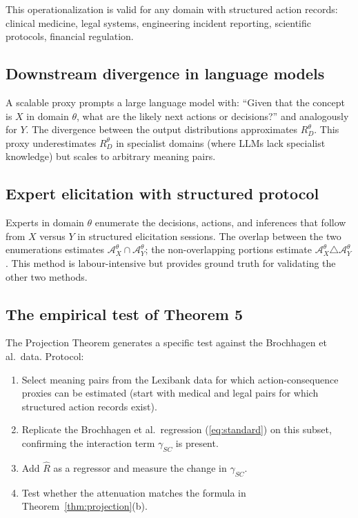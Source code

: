 \documentclass[12pt]{article}
\theoremstyle{rthm}
\theoremstyle{rdef}
\theoremstyle{remark}
\newcommand{\A}{\mathcal{A}}
\newcommand{\RD}[1][\theta]{R_{D}^{#1}}
\begin{document}
This operationalization is valid for any domain with structured action records:
clinical medicine, legal systems, engineering incident reporting, scientific
protocols, financial regulation.

\subsection{Downstream divergence in language models}

A scalable proxy prompts a large language model with: ``Given that the concept
is $X$ in domain $\theta$, what are the likely next actions or decisions?''
and analogously for $Y$. The divergence between the output distributions
approximates $\RD$. This proxy underestimates $\RD$ in specialist domains
(where LLMs lack specialist knowledge) but scales to arbitrary meaning pairs.

\subsection{Expert elicitation with structured protocol}

Experts in domain $\theta$ enumerate the decisions, actions, and inferences
that follow from $X$ versus $Y$ in structured elicitation sessions. The
overlap between the two enumerations estimates $\A_X^{\theta} \cap \A_Y^{\theta}$;
the non-overlapping portions estimate $\A_X^{\theta} \triangle \A_Y^{\theta}$.
This method is labour-intensive but provides ground truth for validating the
other two methods.

\subsection{The empirical test of Theorem 5}

The Projection Theorem generates a specific test against the Brochhagen et al.\
data. Protocol:

\begin{enumerate}
  \item Select meaning pairs from the Lexibank data for which action-consequence
        proxies can be estimated (start with medical and legal pairs for which
        structured action records exist).
  \item Replicate the Brochhagen et al.\ regression (\ref{eq:standard}) on this
        subset, confirming the interaction term $\gamma_{SC}$ is present.
  \item Add $\widehat{R}$ as a regressor and measure the change in $\gamma_{SC}$.
  \item Test whether the attenuation matches the formula in
        Theorem~\ref{thm:projection}(b).
\end{enumerate}
\end{document}
